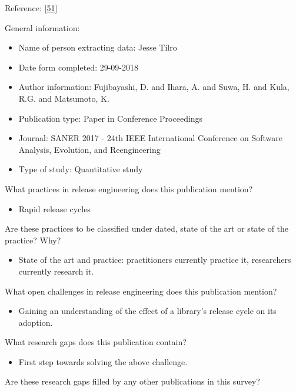 \documentclass[]{book}
\providecommand{\tightlist}{%
  \setlength{\itemsep}{0pt}\setlength{\parskip}{0pt}}
\begin{document}
Reference: {[}\protect\hyperlink{ref-fujibayashi2017a}{51}{]}

General information:

\begin{itemize}
\tightlist
\item
  Name of person extracting data: Jesse Tilro
\item
  Date form completed: 29-09-2018
\item
  Author information: Fujibayashi, D. and Ihara, A. and Suwa, H. and
  Kula, R.G. and Matsumoto, K.
\item
  Publication type: Paper in Conference Proceedings
\item
  Journal: SANER 2017 - 24th IEEE International Conference on Software
  Analysis, Evolution, and Reengineering
\item
  Type of study: Quantitative study
\end{itemize}

What practices in release engineering does this publication mention?

\begin{itemize}
\tightlist
\item
  Rapid release cycles
\end{itemize}

Are these practices to be classified under dated, state of the art or
state of the practice? Why?

\begin{itemize}
\tightlist
\item
  State of the art and practice: practitioners currently practice it,
  researchers currently research it.
\end{itemize}

What open challenges in release engineering does this publication
mention?

\begin{itemize}
\tightlist
\item
  Gaining an understanding of the effect of a library's release cycle on
  its adoption.
\end{itemize}

What research gaps does this publication contain?

\begin{itemize}
\tightlist
\item
  First step towards solving the above challenge.
\end{itemize}

Are these research gaps filled by any other publications in this survey?
\end{document}
